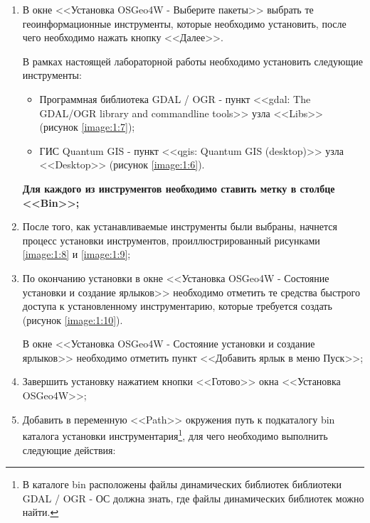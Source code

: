\begin{enumerate}
	Данный пункт выполняется только в случае установки инструментария с загрузкой пакетов из сети Интернет;

	\item В окне <<Установка OSGeo4W - Выберите пакеты>> выбрать те геоинформационные инструменты, которые необходимо установить, после чего необходимо нажать кнопку <<Далее>>.

	В рамках настоящей лабораторной работы необходимо установить следующие инструменты:

	\begin{itemize}

		\item Программная библиотека GDAL / OGR - пункт <<gdal: The GDAL/OGR library and commandline tools>> узла <<Libs>> (рисунок \ref{image:1:7});
		\item ГИС Quantum GIS - пункт <<qgis: Quantum GIS (desktop)>> узла <<Desktop>> (рисунок \ref{image:1:6}).

	\end{itemize}

	{\bf Для каждого из инструментов необходимо ставить метку в столбце <<Bin>>;}

	\item После того, как устанавливаемые инструменты были выбраны, начнется процесс установки инструментов, проиллюстрированный рисунками \ref{image:1:8} и \ref{image:1:9};
	\item По окончанию установки в окне <<Установка OSGeo4W - Состояние установки и создание ярлыков>> необходимо отметить те средства быстрого доступа к установленному инструментарию, которые требуется создать (рисунок \ref{image:1:10}).

	В окне <<Установка OSGeo4W - Состояние установки и создание ярлыков>> необходимо отметить пункт <<Добавить ярлык в меню Пуск>>;

	\item Завершить установку нажатием кнопки <<Готово>> окна <<Установка OSGeo4W>>;
	\item Добавить в переменную <<Path>> окружения путь к подкаталогу bin каталога установки инструментария\footnote{В каталоге bin расположены файлы динамических библиотек библиотеки GDAL / OGR - ОС должна знать, где файлы динамических библиотек можно найти.}, для чего необходимо выполнить следующие действия:

	\begin{enumerate}


\end{enumerate}
\end{enumerate}
